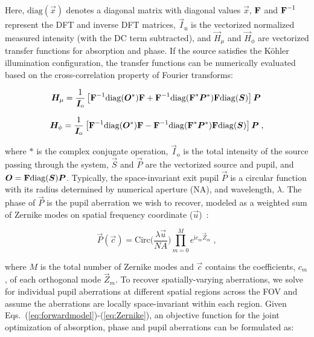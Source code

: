 \noindent Here, $\mathrm{diag}(\vec{x})$ denotes a diagonal matrix with diagonal values $\vec{x}$, $\boldsymbol{\mathbf{F}}$ and $\boldsymbol{\mathbf{F}}^{-1}$ represent the DFT and inverse DFT matrices, $\vec{I}_{\mathrm{n}}$ is the vectorized normalized measured intensity (with the DC term subtracted), and $\vec{H}_{\mu}$ and $\vec{H}_{\phi}$ are vectorized transfer functions for absorption and phase. If the source satisfies the K\"{o}hler illumination configuration, the transfer functions can be numerically evaluated based on the cross-correlation property of Fourier transforms:

\begin{equation}
\label{eq:Hu_matrix}
\bm{H}_{\mu} = \frac{1}{\bm{I}_{\mathrm{o}}}\left[\boldsymbol{\mathbf{F}}^{-1}\mathrm{diag} (\bm{O}^{*}) \boldsymbol{\mathbf{F}} + \boldsymbol{\mathbf{F}}^{-1}\mathrm{diag} (\boldsymbol{\mathbf{F}}^{*}{\bm{P}}^{*})\boldsymbol{\mathbf{F}}\mathrm{diag}(\bm{S})\right]\bm{P}\;
\end{equation}

\begin{equation}
\label{eq:Hp_matrix}
\bm{H}_{\phi} = \frac{1}{\bm{I}_{\mathrm{o}}}\left[\boldsymbol{\mathbf{F}}^{-1}\mathrm{diag} (\bm{O}^{*}) \boldsymbol{\mathbf{F}} - \boldsymbol{\mathbf{F}}^{-1}\mathrm{diag} (\boldsymbol{\mathbf{F}}^{*}{\bm{P}}^{*})\boldsymbol{\mathbf{F}}\mathrm{diag}(\bm{S})\right]\bm{P}\;,
\end{equation}

\noindent where $*$ is the complex conjugate operation, $\vec{I}_{\mathrm{o}}$ is the total intensity of the source passing through the system, $\vec{S}$ and $\vec{P}$ are the vectorized source and pupil, and $\bm{O} = \boldsymbol{\mathbf{F}}\mathrm{diag}(\bm{S})\bm{P}$. Typically, the space-invariant exit pupil $\vec{P}$ is a circular function with its radius determined by numerical aperture ($\mathrm{NA}$), and wavelength, $\lambda$. The phase of $\vec{P}$ is the pupil aberration we wish to recover, modeled as a weighted sum of Zernike modes on spatial frequency coordinate ($\vec{u}$)~\cite{ZERNIKE1934689}:

\begin{equation}
\label{eq:Zernike}
\vec{P}(\vec{c}) = \mathrm{Circ}\Big(\frac{\lambda\vec{u}}{NA}\Big)\prod_{m=0}^{M} e^{\mathrm{i}c_{m}\vec{Z}_{m}}\; ,
\end{equation}

\noindent where $M$ is the total number of Zernike modes and $\vec{c}$ contains the coefficients, $c_{m}$, of each orthogonal mode $\vec{Z}_{m}$. To recover spatially-varying aberrations, we solve for individual pupil aberrations at different spatial regions across the FOV and assume the aberrations are locally space-invariant within each region. Given Eqs.~(\ref{eq:forwardmodel})-(\ref{eq:Zernike}), an objective function for the joint optimization of absorption, phase and pupil aberrations can be formulated as:

